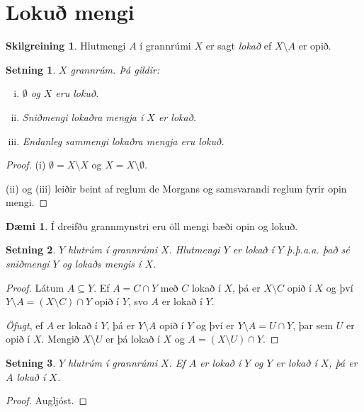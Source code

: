 \documentclass[a4paper,icelandic]{book}
\theoremstyle{definition}
\newtheorem{skilgr}{Skilgreining}[section]
\newtheorem{daemi}{Dæmi}[section]
\theoremstyle{plain}
\newtheorem{setn}{Setning}[section]
\theoremstyle{remark}
\begin{document}
\section{Lokuð mengi}
\begin{skilgr}
  Hlutmengi $A$ í grannrúmi $X$ er sagt \emph{lokað} ef
  $X\setminus A$ er opið.
\end{skilgr}
\begin{setn}
  $X$ grannrúm. Þá gildir:
  \begin{enumerate}[(i)]
    \item $\emptyset$ og $X$ eru lokuð.
    \item Sniðmengi lokaðra mengja í $X$ er lokað.
    \item Endanleg sammengi lokaðra mengja eru lokuð.
  \end{enumerate}
\end{setn}
\begin{proof}
  (i) $\emptyset = X\setminus X$ og $X = X\setminus\emptyset$.
  
  (ii) og (iii) leiðir beint af reglum de Morgans og samsvarandi reglum fyrir
  opin mengi.
\end{proof}
\begin{daemi}
  Í dreifðu grannmynstri eru öll mengi bæði opin og lokuð.
\end{daemi}
\begin{setn}
  $Y$ hlutrúm í grannrúmi $X$. Hlutmengi $Y$ er lokað í $Y$ \emph{þ.þ.a.a.} það
  sé sniðmengi $Y$ og lokaðs mengis í $X$.
\end{setn}
\begin{proof}
  Látum $A\subseteq Y$. Ef $A = C\cap Y$ með $C$ lokað í $X$, þá er $X\setminus
  C$ opið í $X$ og því $Y\setminus A = (X\setminus C)\cap Y$ opið í $Y$, svo $A$
  er lokað í $Y$.

  \emph{Öfugt}, ef $A$ er lokað í $Y$, þá er $Y\setminus A$ opið í $Y$ og því er
  $Y\setminus A = U\cap Y$, þar sem $U$ er opið í $X$. Mengið $X\setminus U$ er
  þá lokað í $X$ og $A = (X\setminus U)\cap Y$.
\end{proof}
\begin{setn}
  $Y$ hlutrúm í grannrúmi $X$. Ef $A$ er lokað í $Y$ og $Y$ er lokað í $X$, þá
  er $A$ lokað í $X$.
\end{setn}
\begin{proof}
  Augljóst.
\end{proof}

\end{document}
